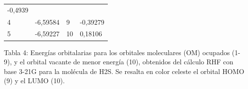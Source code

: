 \documentclass[]{article}
\begin{document}
\begin{longtable}[]{@{}llll@{}}
\begin{minipage}[t]{0.22\columnwidth}
{-0,4939}\strut
\end{minipage}\tabularnewline
\begin{minipage}[t]{0.22\columnwidth}\raggedright\strut
{4}\strut
\end{minipage} & \begin{minipage}[t]{0.22\columnwidth}\raggedright\strut
{-6,59584}\strut
\end{minipage} & \begin{minipage}[t]{0.22\columnwidth}\raggedright\strut
{9}\strut
\end{minipage} & \begin{minipage}[t]{0.22\columnwidth}\raggedright\strut
{-0,39279}\strut
\end{minipage}\tabularnewline
\begin{minipage}[t]{0.22\columnwidth}\raggedright\strut
{5}\strut
\end{minipage} & \begin{minipage}[t]{0.22\columnwidth}\raggedright\strut
{-6,59227}\strut
\end{minipage} & \begin{minipage}[t]{0.22\columnwidth}\raggedright\strut
{10}\strut
\end{minipage} & \begin{minipage}[t]{0.22\columnwidth}\raggedright\strut
{0,18106}\strut
\end{minipage}\tabularnewline
\bottomrule
\end{longtable}

{}

{Tabla 4}{: Energías orbitalarias para los orbitales moleculares (OM)
ocupados (1-9), y el orbital vacante de menor energía (10), obtenidos
del cálculo RHF con base 3-21G para la molécula de H}{2}{S. Se resalta
en color celeste el orbital HOMO (9) y el LUMO (10).}

{}

\protect\hypertarget{t.0d6cdc5d95ba285b548b869a4764ccb9b699afd0}{}{}\protect\hypertarget{t.4}{}{}
\end{document}
